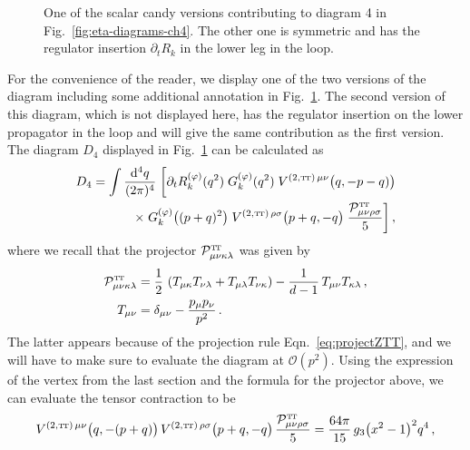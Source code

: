 \documentclass[11pt]{book}
\newcommand\TTspace{ -1pt }
\newcommand\TT{ \scriptscriptstyle{\mathrm{T\hspace{\TTspace}T}} }
\numberwithin{equation}{chapter}
\begin{document}
\begin{appendices}
\begin{figure}
  \begin{center}
    
  \end{center}
  \vspace*{-18mm}
  \caption{
    One of the scalar candy versions contributing to diagram 4 in Fig.~\ref{fig:eta-diagrams-ch4}.
    The other one is symmetric and has the regulator insertion $\partial_t R_k$ in the lower leg in the loop.
  }
  \label{fig:scalarcandy}
\end{figure}

For the convenience of the reader, we display one of the two versions
of the diagram including some additional annotation in Fig.~\ref{fig:scalarcandy}.
The second version of this diagram, which is not displayed here,
has the regulator insertion on the lower propagator in the loop and will
give the same contribution as the first version.
The diagram $D_4$ displayed in Fig.~\ref{fig:scalarcandy} can be calculated as
\begin{align}
  D_4 = \int \frac{\mathrm{d}^4 q}{(2\pi)^4} \;
  \bigg[
  \partial_t R_k^{(\varphi)}(q^2) \;
  G_k^{(\varphi)}(q^2) \;
  V^{(2,{\TT})\,\mu\nu} \big( q, -p-q) \big) \nonumber \\
  \times \;
  G_k^{(\varphi)} \big( (p+q)^2 \big) \;
  V^{(2,{\TT})\,\rho\sigma} \big( p+q, -q \big) \;
  \frac{ \mathcal{P}^{\TT}_{\mu\nu\rho\sigma} }{ 5 }
  \bigg]
  \,,
\end{align}
where we recall that the projector $\mathcal{P}^{\TT}_{\mu\nu\kappa\lambda}$
was given by
\begin{align}
  \mathcal{P}^{\TT}_{\mu\nu\kappa\lambda}
  &= \frac{1}{2} \,
  \left(
    T_{\mu
    \kappa}T_{\nu \lambda}
    + T_{\mu\lambda}T_{\nu \kappa}
  \right)
  - \frac{1}{d-1} \, T_{\mu\nu}T_{\kappa\lambda} \,, \\
  T_{\mu \nu} &= \delta_{\mu\nu}- \frac{ p_{\mu}p_{\nu} }{ p^2 } \,.
\end{align}
The latter appears because of the projection rule Eqn.~\eqref{eq:projectZTT},
and we will have to make sure to evaluate the diagram at $\mathcal O(p^2)$.
Using the expression of the vertex from the last section and the formula
for the projector above, we can evaluate the tensor contraction
to be
\begin{align}
  V^{(2,{\TT})\,\mu\nu} \big( q, -(p+q) \big) \,
  V^{(2,{\TT})\,\rho\sigma} \big( p+q, -q \big) \,
  \frac{ \mathcal{P}^{\TT}_{\mu\nu\rho\sigma} }{ 5 }
  =
  \frac{ 64 \pi }{ 15 } \, g_3 \big( x^2 - 1 \big) ^2 q^4 \,,

\end{align}
\end{appendices}
\end{document}
